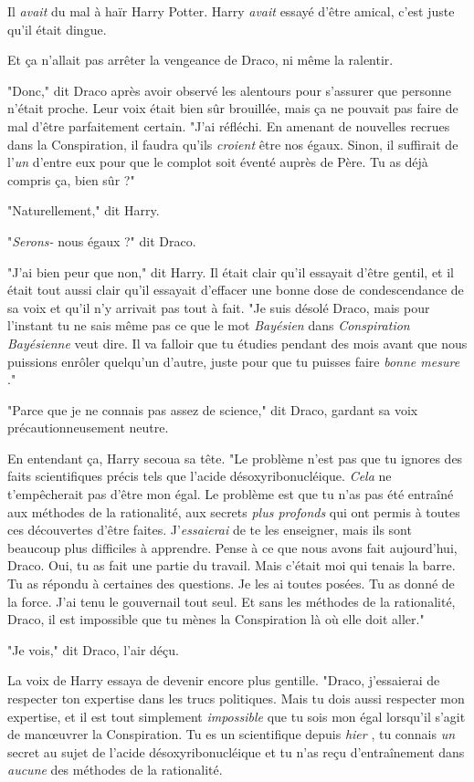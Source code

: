 Il \emph{avait}  du mal à haïr Harry Potter. Harry \emph{avait}  essayé d'être amical, c'est juste qu'il était dingue.

Et ça n'allait pas arrêter la vengeance de Draco, ni même la ralentir.

"Donc," dit Draco après avoir observé les alentours pour s'assurer que personne n'était proche. Leur voix était bien sûr brouillée, mais ça ne pouvait pas faire de mal d'être parfaitement certain. "J'ai réfléchi. En amenant de nouvelles recrues dans la Conspiration, il faudra qu'ils \emph{croient}  être nos égaux. Sinon, il suffirait de l'\emph{un}  d'entre eux pour que le complot soit éventé auprès de Père. Tu as déjà compris ça, bien sûr ?"

"Naturellement," dit Harry.

"\emph{Serons-} nous égaux ?" dit Draco.

"J'ai bien peur que non," dit Harry. Il était clair qu'il essayait d'être gentil, et il était tout aussi clair qu'il essayait d'effacer une bonne dose de condescendance de sa voix et qu'il n'y arrivait pas tout à fait. "Je suis désolé Draco, mais pour l'instant tu ne sais même pas ce que le mot \emph{Bayésien}  dans \emph{Conspiration}  \emph{Bayésienne } veut dire. Il va falloir que tu étudies pendant des mois avant que nous puissions enrôler quelqu'un d'autre, juste pour que tu puisses faire \emph{bonne mesure} ."

"Parce que je ne connais pas assez de science," dit Draco, gardant sa voix précautionneusement neutre.

En entendant ça, Harry secoua sa tête. "Le problème n'est pas que tu ignores des faits scientifiques précis tels que l'acide désoxyribonucléique. \emph{Cela}  ne t'empêcherait pas d'être mon égal. Le problème est que tu n'as pas été entraîné aux méthodes de la rationalité, aux secrets \emph{plus profonds}  qui ont permis à toutes ces découvertes d'être faites. J'\emph{essaierai}  de te les enseigner, mais ils sont beaucoup plus difficiles à apprendre. Pense à ce que nous avons fait aujourd'hui, Draco. Oui, tu as fait une partie du travail. Mais c'était moi qui tenais la barre. Tu as répondu à certaines des questions. Je les ai toutes posées. Tu as donné de la force. J'ai tenu le gouvernail tout seul. Et sans les méthodes de la rationalité, Draco, il est impossible que tu mènes la Conspiration là où elle doit aller."

"Je vois," dit Draco, l'air déçu.

La voix de Harry essaya de devenir encore plus gentille. "Draco, j'essaierai de respecter ton expertise dans les trucs politiques. Mais tu dois aussi respecter mon expertise, et il est tout simplement \emph{impossible}  que tu sois mon égal lorsqu'il s'agit de manœuvrer la Conspiration. Tu es un scientifique depuis \emph{hier} , tu connais \emph{un}  secret au sujet de l'acide désoxyribonucléique et tu n'as reçu d'entraînement dans \emph{aucune}  des méthodes de la rationalité.

